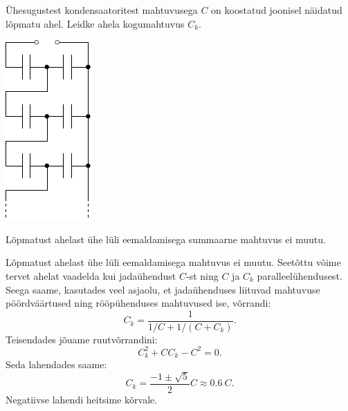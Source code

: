 
Ühesugustest kondensaatoritest mahtuvusega $C$ on koostatud joonisel näidatud lõpmatu ahel. Leidke ahela kogumahtuvus $C_k$.

\begin{center}
	\includegraphics[width=0.3\linewidth]{2007-v2g-08-yl}
\end{center}

\hint
Lõpmatust ahelast ühe lüli eemaldamisega summaarne mahtuvus ei muutu.

\solu
Lõpmatust ahelast ühe lüli eemaldamisega mahtuvus ei muutu. Seetõttu võime tervet ahelat vaadelda kui jadaühendust $C$-st ning $C$ ja $C_k$ paralleelühendusest. Seega saame, kasutades veel asjaolu, et jadaühenduses liituvad mahtuvuse pöördväärtused ning rööpühenduses mahtuvused ise, võrrandi:
\[
C_{k}=\frac{1}{1 / C+1 /\left(C+C_{k}\right)}.
\]
Teisendades jõuame ruutvõrrandini:
\[
C_{k}^{2}+C C_{k}-C^{2}=0.
\]
Seda lahendades saame:
\[
C_{k}=\frac{-1 \pm \sqrt{5}}{2} C \approx \SI{0,6}{C}.
\]
Negatiivse lahendi heitsime kõrvale.
\probend